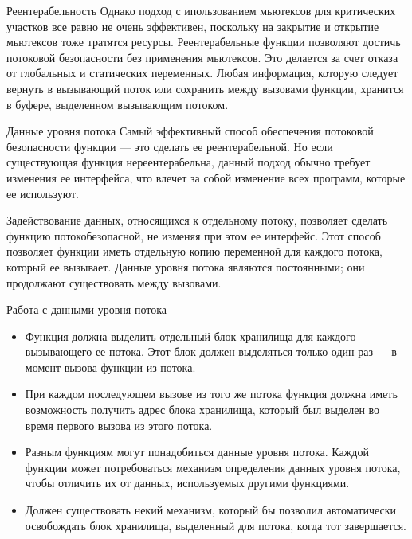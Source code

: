 \documentclass{beamer}
\begin{document}
\begin{frame}{Реентерабельность}
    Однако подход с ипользованием мьютексов для критических участков все равно не очень эффективен, поскольку на закрытие и открытие мьютексов тоже тратятся ресурсы. Реентерабельные функции позволяют достичь потоковой безопасности без применения мьютексов. Это делается за счет отказа от глобальных и статических переменных. Любая информация, которую следует вернуть в вызывающий поток или сохранить между вызовами функции, хранится в буфере, выделенном вызывающим потоком.
\end{frame}

\begin{frame}{Данные уровня потока}
    Самый эффективный способ обеспечения потоковой безопасности функции — это сделать ее реентерабельной. Но если существующая функция нереентерабельна, данный подход обычно требует изменения ее интерфейса, что влечет за собой изменение всех программ, которые ее используют.
    
    Задействование данных, относящихся к отдельному потоку, позволяет сделать функцию потокобезопасной, не изменяя при этом ее интерфейс. Этот способ позволяет функции иметь отдельную копию переменной для каждого потока, который ее вызывает. Данные уровня потока являются постоянными; они продолжают существовать между вызовами. 
\end{frame}

\begin{frame}{Работа с данными уровня потока}
    \begin{itemize}
        \item Функция должна выделить отдельный блок хранилища для каждого вызывающего ее потока. Этот блок должен выделяться только один раз — в момент вызова функции из потока.
        \item При каждом последующем вызове из того же потока функция должна иметь возможность получить адрес блока хранилища, который был выделен во время первого вызова из этого потока.
        \item Разным функциям могут понадобиться данные уровня потока. Каждой функции может потребоваться механизм определения данных уровня потока, чтобы отличить их от данных, используемых другими функциями.
        \item  Должен существовать некий механизм, который бы позволил автоматически освобождать блок хранилища, выделенный для потока, когда тот завершается. 
    \end{itemize}
\end{frame}
\end{document}
